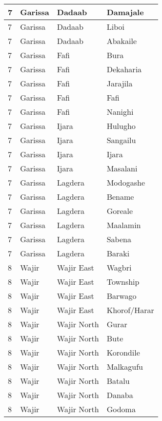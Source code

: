 \begin{table}[!ht]
\begin{tabular}{|l|l|l|l|}
        7 & Garissa & Dadaab & Damajale \\ \hline
        7 & Garissa & Dadaab & Liboi \\ \hline
        7 & Garissa & Dadaab & Abakaile \\ \hline
        7 & Garissa & Fafi & Bura \\ \hline
        7 & Garissa & Fafi & Dekaharia \\ \hline
        7 & Garissa & Fafi & Jarajila \\ \hline
        7 & Garissa & Fafi & Fafi \\ \hline
        7 & Garissa & Fafi & Nanighi \\ \hline
        7 & Garissa & Ijara & Hulugho \\ \hline
        7 & Garissa & Ijara & Sangailu \\ \hline
        7 & Garissa & Ijara & Ijara \\ \hline
        7 & Garissa & Ijara & Masalani \\ \hline
        7 & Garissa & Lagdera & Modogashe \\ \hline
        7 & Garissa & Lagdera & Bename \\ \hline
        7 & Garissa & Lagdera & Goreale \\ \hline
        7 & Garissa & Lagdera & Maalamin \\ \hline
        7 & Garissa & Lagdera & Sabena \\ \hline
        7 & Garissa & Lagdera & Baraki \\ \hline
        8 & Wajir & Wajir East & Wagbri \\ \hline
        8 & Wajir & Wajir East & Township \\ \hline
        8 & Wajir & Wajir East & Barwago \\ \hline
        8 & Wajir & Wajir East & Khorof/Harar \\ \hline
        8 & Wajir & Wajir North & Gurar \\ \hline
        8 & Wajir & Wajir North & Bute \\ \hline
        8 & Wajir & Wajir North & Korondile \\ \hline
        8 & Wajir & Wajir North & Malkagufu \\ \hline
        8 & Wajir & Wajir North & Batalu \\ \hline
        8 & Wajir & Wajir North & Danaba \\ \hline
        8 & Wajir & Wajir North & Godoma \\ \hline

\end{tabular}
\end{table}
